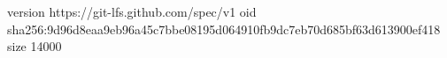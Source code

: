 version https://git-lfs.github.com/spec/v1
oid sha256:9d96d8eaa9eb96a45c7bbe08195d064910fb9dc7eb70d685bf63d613900ef418
size 14000

